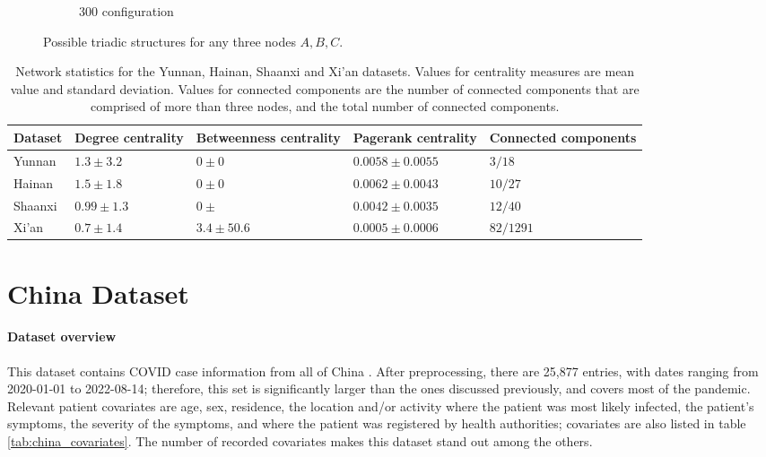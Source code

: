 \begin{figure}
\begin{mdframed}
\begin{subfigure}[b]{0.2\linewidth}
		\caption{300 configuration}
	\end{subfigure}
	\caption{Possible triadic structures for any three nodes $A,B,C$.}
	\label{fig:triadic_structures}
	\end{mdframed}
\end{figure}

\begin{table}
	\begin{mdframed}
		\begin{tabularx}{\linewidth}{XXXXX}
		\hline
		\textbf{Dataset} & \textbf{Degree centrality} & \textbf{Betweenness centrality} & \textbf{Pagerank centrality} & \textbf{Connected components} \\
		\hline
		Yunnan & $1.3\pm3.2$ & $0\pm0$ & $0.0058\pm0.0055$ & $3/18$ \\
		Hainan & $1.5\pm1.8$ & $0\pm0$ & $0.0062\pm0.0043$ & $10/27$ \\
		Shaanxi & $0.99\pm1.3$ & $0\pm$ & $0.0042\pm0.0035$ & $12/40$ \\
		Xi'an & $0.7\pm1.4$ & $3.4\pm50.6$ & $0.0005\pm0.0006$ & $82/1291$\\
		\hline
	\end{tabularx}
	\caption{Network statistics for the Yunnan, Hainan, Shaanxi and Xi'an datasets. Values for centrality measures are mean value and standard deviation. Values for connected components are the number of connected components that are comprised of more than three nodes, and the total number of connected components.}
	\label{tab:network_stats}
	\end{mdframed}
\end{table}

\section{China Dataset}
\label{sec:china_data}

\paragraph{Dataset overview} This dataset contains COVID case information from all of China \cite{china_publication,china_data}. After preprocessing, there are 25,877 entries, with dates ranging from 2020-01-01 to 2022-08-14; therefore, this set is significantly larger than the ones discussed previously, and covers most of the pandemic. Relevant patient covariates are age, sex, residence, the location and/or activity where the patient was most likely infected, the patient's symptoms, the severity of the symptoms, and where the patient was registered by health authorities; covariates are also listed in table \ref{tab:china_covariates}. The number of recorded covariates makes this dataset stand out among the others.

